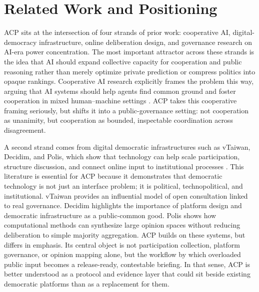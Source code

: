 \documentclass[11pt]{article}
\begin{document}
\section{Related Work and Positioning}

ACP sits at the intersection of four strands of prior work: cooperative AI, digital-democracy infrastructure, online deliberation design, and governance research on AI-era power concentration. The most important attractor across these strands is the idea that AI should expand collective capacity for cooperation and public reasoning rather than merely optimize private prediction or compress politics into opaque rankings. Cooperative AI research explicitly frames the problem this way, arguing that AI systems should help agents find common ground and foster cooperation in mixed human--machine settings \cite{Dafoe2020OpenProblems,Dafoe2021CommonGround}. ACP takes this cooperative framing seriously, but shifts it into a public-governance setting: not cooperation as unanimity, but cooperation as bounded, inspectable coordination across disagreement.

\vspace{0.1in}
A second strand comes from digital democratic infrastructures such as vTaiwan, Decidim, and Polis, which show that technology can help scale participation, structure discussion, and connect online input to institutional processes \cite{Hsiao2018vTaiwan,Aragon2017Decidim,Barandiaran2024Decidim,Small2021Polis}. This literature is essential for ACP because it demonstrates that democratic technology is not just an interface problem; it is political, technopolitical, and institutional. vTaiwan provides an influential model of open consultation linked to real governance. Decidim highlights the importance of platform design and democratic infrastructure as a public-common good. Polis shows how computational methods can synthesize large opinion spaces without reducing deliberation to simple majority aggregation. ACP builds on these systems, but differs in emphasis. Its central object is not participation collection, platform governance, or opinion mapping alone, but the workflow by which overloaded public input becomes a release-ready, contestable briefing. In that sense, ACP is better understood as a protocol and evidence layer that could sit beside existing democratic platforms than as a replacement for them.
\end{document}
